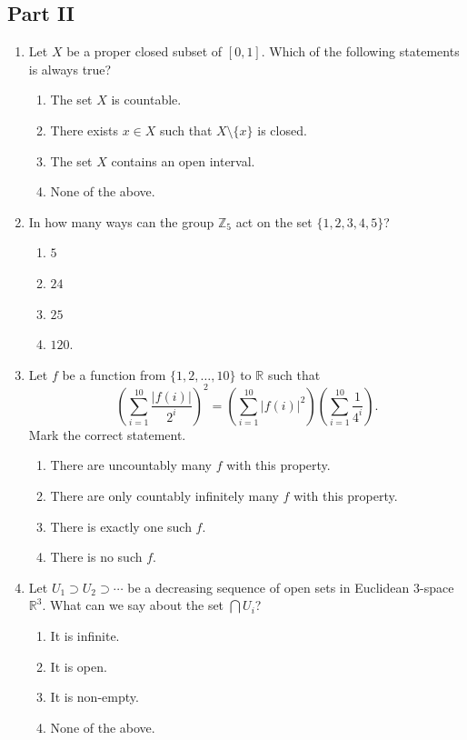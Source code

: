 \documentclass[11pt, a4paper]{article}
\begin{document}
\subsection*{Part II}
\begin{enumerate}[resume]
  \item Let $X$ be a proper closed subset of $[0, 1]$. Which of the following statements is always true?
  \begin{enumerate}[label=\Alph*.]
    \item The set $X$ is countable.
    \item There exists $x \in X$ such that $X \setminus \{x\}$ is closed.
    \item The set $X$ contains an open interval.
    \item None of the above.
  \end{enumerate}

  \item In how many ways can the group $\mathbb{Z}_5$ act on the set $\{1, 2, 3, 4, 5\}$?
  \begin{enumerate}[label=\Alph*.]
    \item $5$
    \item $24$
    \item $25$
    \item $120$.
  \end{enumerate}

  \item Let $f$ be a function from $\{1, 2, \dots, 10\}$ to $\mathbb{R}$ such that
  \[
    \left(\sum_{i=1}^{10} \frac{|f(i)|}{2^i}\right)^2 = \left(\sum_{i=1}^{10} |f(i)|^2\right) \left(\sum_{i=1}^{10} \frac{1}{4^i}\right).
  \]
  Mark the correct statement.
  \begin{enumerate}[label=\Alph*.]
    \item There are uncountably many $f$ with this property.
    \item There are only countably infinitely many $f$ with this property.
    \item There is exactly one such $f$.
    \item There is no such $f$.
  \end{enumerate}

  \item Let $U_1 \supset U_2 \supset \cdots$ be a decreasing sequence of open sets in Euclidean $3$-space $\mathbb{R}^3$. What can we say about the set $\bigcap U_i$?
  \begin{enumerate}[label=\Alph*.]
    \item It is infinite.
    \item It is open.
    \item It is non-empty.
    \item None of the above.
  \end{enumerate}


\end{enumerate}
\end{document}
